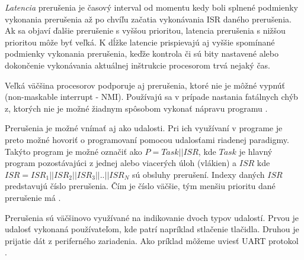 \textit{Latencia} prerušenia je časový interval od momentu kedy boli splnené podmienky vykonania prerušenia až po chvíľu začatia vykonávania ISR daného prerušenia. Ak sa objaví ďalšie prerušenie s vyššou prioritou, latencia prerušenia s nižšou prioritou môže byť veľká. K dĺžke latencie prispievajú aj vyššie spomínané podmienky vykonania prerušenia, keďže kontrola či sú bity nastavené alebo dokončenie vykonávania aktuálnej inštrukcie procesorom trvá nejaký čas. \par
Veľká väčšina procesorov podporuje aj prerušenia, ktoré nie je môžné vypnúť (non-maskable interrupt - NMI). Používajú sa v prípade nastania fatálnych chýb z, ktorých nie je možné žiadnym spôsobom vykonať nápravu programu
\cite{regehrSafeStructuredUse2007}. \par
Prerušenia je možné vnímať aj ako udalosti. Pri ich využívaní v programe je preto možné hovoriť o programovaní pomocou udalosťami riadenej paradigmy. Takýto program je možné označiť ako \begin{math}P=Task || ISR\end{math}, kde \begin{math}Task\end{math} je hlavný program pozostávajúci z jednej alebo viacerých úloh (vlákien) a  \begin{math}ISR\end{math} kde \begin{math}ISR=ISR_1||ISR_2||ISR_3||..||ISR_N\end{math} sú obsluhy prerušení.
Indexy daných \begin{math}ISR\end{math} predstavujú číslo prerušenia. Čím je číslo väčšie, tým menšiu prioritu dané prerušenie má \cite{wangAutomaticDetectionValidation2017}. \par Prerušenia sú väčšinovo využívané na indikovanie dvoch typov udalostí. Prvou je udalosť vykonaná používateľom, kde patrí napríklad stlačenie tlačidla. Druhou je prijatie dát z periferného zariadenia. Ako príklad môžeme uviesť UART protokol \cite{wangAutomaticDetectionValidation2017}.